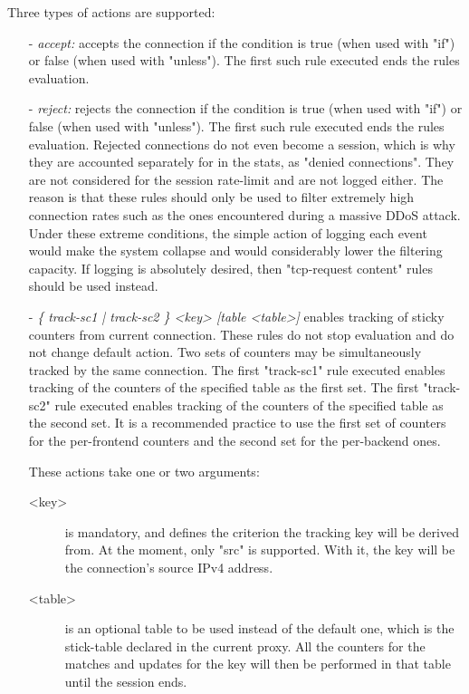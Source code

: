   Three types of actions are supported:
  \begin{itemize}
  \item[-] \emph{accept:}
        accepts the connection if the condition is true (when used with "if")
        or false (when used with "unless"). The first such rule executed ends
        the rules evaluation.

  \item[-] \emph{reject:}
        rejects the connection if the condition is true (when used with "if")
        or false (when used with "unless"). The first such rule executed ends
        the rules evaluation. Rejected connections do not even become a
        session, which is why they are accounted separately for in the stats,
        as "denied connections". They are not considered for the session
        rate-limit and are not logged either. The reason is that these rules
        should only be used to filter extremely high connection rates such as
        the ones encountered during a massive DDoS attack. Under these extreme
        conditions, the simple action of logging each event would make the
        system collapse and would considerably lower the filtering capacity. If
        logging is absolutely desired, then "tcp-request content" rules should
        be used instead.

   \item[-] \emph{\{ track-sc1 | track-sc2 \} <key> [table <table>]}
        enables tracking of sticky counters from current connection. These
        rules do not stop evaluation and do not change default action. Two sets
        of counters may be simultaneously tracked by the same connection. The
        first "track-sc1" rule executed enables tracking of the counters of the
        specified table as the first set. The first "track-sc2" rule executed
        enables tracking of the counters of the specified table as the second
        set. It is a recommended practice to use the first set of counters for
        the per-frontend counters and the second set for the per-backend ones.

        These actions take one or two arguments:
        \begin{description}
        \item[<key>] is mandatory, and defines the criterion the tracking key will
                  be derived from. At the moment, only "src" is supported. With
                  it, the key will be the connection's source IPv4 address.

        \item[<table>] is an optional table to be used instead of the default one,
                  which is the stick-table declared in the current proxy. All
                  the counters for the matches and updates for the key will
                  then be performed in that table until the session ends.
        \end{description}


\end{itemize}

